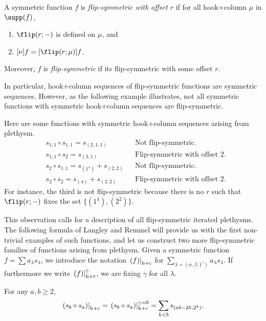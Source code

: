 \documentclass[twoside]{article}
\renewcommand{\hc}[1]{\left.\left(#1\right)\right|_{\textnormal{h+c}}}
\renewcommand{\hcG}[1]{\left.\left(#1\right)\right|_{\textnormal{h+c}}^{\gamma}}
\renewcommand{\hcZ}[1]{\left.\left(#1\right)\right|_{\textnormal{h+c}}^{\gamma=0}}
\begin{document}
\begin{de}
    A symmetric function $f$ is \emph{flip-symmetric with offset $r$} if for all hook+column $\mu$ in $\supp(f)$,
    \begin{enumerate}
    \item $\flip(r;-)$ is defined on $\mu$, and \item $[\nu]f = [\flip(r;\mu)]f$.
    \end{enumerate} Moreover, $f$ is \emph{flip-symmetric} if its flip-symmetric with some offset $r$.
\end{de}

In particular, hook+column sequences of flip-symmetric functions are symmetric sequences.
However, as the following example illustrates, not all symmetric functions with symmetric hook+column sequences are flip-symmetric.

\begin{ex}\label{ex:counterex}
Here are some functions with symmetric hook+column sequences arising from plethysm.
\begin{align*}
  &s_{1,1}\circ s_{1,1} = s_{(2, 1, 1)}
  && \text{Not flip-symmetric.} \\
  &s_{1,1}\circ s_{2} = s_{(3, 1)}
  &&\text{Flip-symmetric with offset $2$.}\\
  &s_{2}\circ s_{1,1} = s_{(1^4)}+ s_{(2,2)}
  && \text{Not flip-symmetric.} \\
  &s_{2}\circ s_{2} = s_{(4)} + s_{(2,2)}
  &&\text{Flip-symmetric with offset $2$.}
\end{align*}
For instance, the third is not flip-symmetric because there is no $r$ such that $\flip(r;-)$ fixes the set $\{(1^4), (2^2)\}$.
\end{ex}

This observation calls for a description of all flip-symmetric iterated plethysms. The following formula of Langley and Remmel 
will provide us with the first non-trivial examples of such functions, and let us construct two more flip-symmetric families of functions arising from plethysm.
Given a symmetric function $f = \sum a_\lambda s_\lambda$, we introduce the notation $\hc{f}$ for $\sum_{\lambda = (\alpha,\beta,1^\gamma)} a_\lambda s_\lambda$. If furthermore we write $\hcG{f}$, we are fixing $\gamma$  for all $\lambda$.
\begin{thm}\label{sasb} For any $a,b\ge2$, 
\[\hc{s_b\circ s_a} = \hcZ{s_b\circ s_a} = \sum_{k<b}s_{(ab-2k,2^k)}.
\]
\end{thm}
\end{document}
